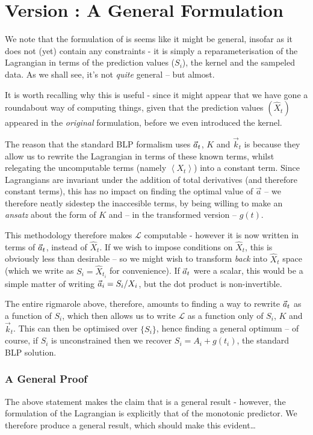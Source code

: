 \documentclass{article}
\def\llangle{\left\langle}
\def\rrangle{\right\rangle}
\newcounter{version}
\newcommand\attempt[1]{\stepcounter{version} \section*{Version \theversion: #1}}
\begin{document}
	\attempt{A General Formulation}

		We note that the formulation of  is seems like it might be general, insofar as it does not (yet) contain any constraints - it is simply a reparameterisation of the Lagrangian in terms of the prediction values ($S_i$), the kernel and the sampeled data. As we shall see, it's not \textit{quite} general -- but almost. 

		It is worth recalling why this is useful - since it might appear that we have gone a roundabout way of computing things, given that the prediction values $(\hat{X}_t)$ appeared in the \textit{original} formulation, before we even introduced the kernel.

		The reason that the standard BLP formalism uses $\vec{a}_t$, $K$ and $\vec{k}_t$ is because they allow us to rewrite the Lagrangian in terms of these known terms, whilst relegating the uncomputable terms (namely $\llangle X_t \rrangle$) into a constant term. Since Lagrangians are invariant under the addition of total derivatives (and therefore constant terms), this has no impact on finding the optimal value of $\vec{a}$ -- we therefore neatly sidestep the inaccesible terms, by being willing to make an \textit{ansatz} about the form of $K$ and -- in the transformed version -- $g(t)$.

		This methodology therefore makes $\mathcal{L}$ computable - however it is now written in terms of $\vec{a}_t$, instead of $\hat{X}_t$. If we wish to impose conditions on $\hat{X}_t$, this is obviously less than desirable -- so we might wish to transform \textit{back} into $\hat{X}_t$ space (which we write as $S_i = \hat{X}_{t_i}$ for convenience). If $\vec{a}_t$ were a scalar, this would be a simple matter of writing $\vec{a}_i = S_i/X_i$, but the dot product is non-invertible.

		The entire rigmarole above, therefore, amounts to finding a way to rewrite $\vec{a}_t$ as a function of $S_i$, which then allows us to write $\mathcal{L}$ as a function only of $S_i$, $K$ and $\vec{k}_t$. This can then be optimised over $\{S_i\}$, hence finding a general optimum -- of course, if $S_i$ is unconstrained then we recover $S_i = A_i + g(t_i)$, the standard BLP solution. 

		\subsubsection*{A General Proof}

			The above statement makes the claim that  is a general result - however, the formulation of the Lagrangian is explicitly that of the monotonic predictor. We therefore produce a general result, which should make this evident\dots
\end{document}
